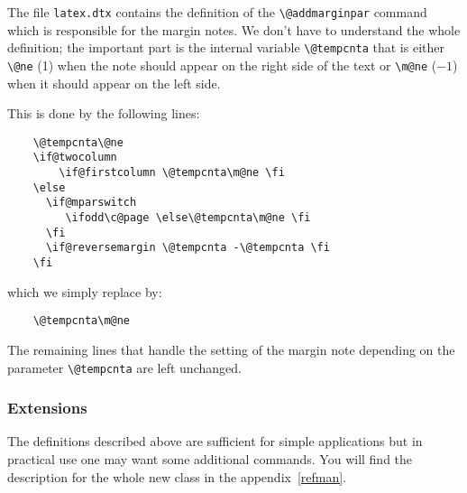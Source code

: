 \documentclass[twoside,a4paper]{refart}
\begin{document}
The file \texttt{latex.dtx} contains the definition of the 
\verb|\@addmarginpar| command which is responsible for the margin 
notes. We don't have to understand the whole definition; the important 
part is the internal variable \verb|\@tempcnta| that is either 
\verb|\@ne| (1) when the note should appear on the right side of the 
text or \verb|\m@ne| ($-1$) when it should appear on the left side.

This is done by the following lines:
\begin{verbatim}
    \@tempcnta\@ne
    \if@twocolumn
        \if@firstcolumn \@tempcnta\m@ne \fi
    \else
      \if@mparswitch
         \ifodd\c@page \else\@tempcnta\m@ne \fi
      \fi
      \if@reversemargin \@tempcnta -\@tempcnta \fi
    \fi
\end{verbatim}

which we simply replace by:
\begin{verbatim}
    \@tempcnta\m@ne
\end{verbatim}

The remaining lines that handle the setting of the margin note 
depending on the parameter \verb|\@tempcnta| are left unchanged.

\subsubsection{Extensions}

The definitions described above are sufficient for simple applications 
but in practical use one may want some additional commands.  
 You will find the description for the whole new 
class in the appendix~\ref{refman}.





\printindex
\end{document}
